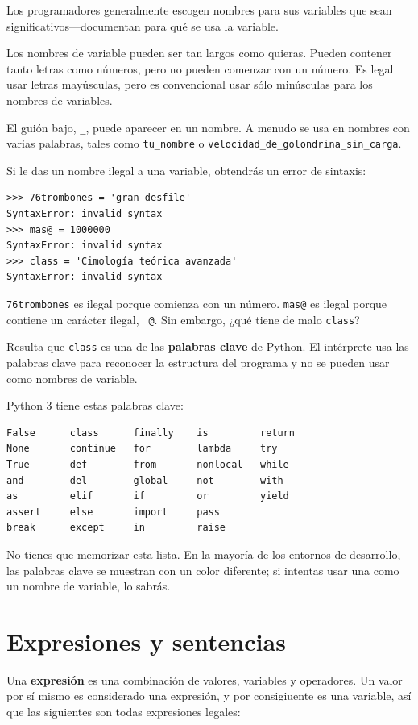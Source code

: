\documentclass[10pt]{book}
\begin{document}
Los programadores generalmente escogen nombres para sus variables que
sean significativos---documentan para qué se usa la variable.

Los nombres de variable pueden ser tan largos como quieras.  Pueden contener
tanto letras como números, pero no pueden comenzar con un número.
Es legal usar letras mayúsculas, pero es convencional
usar sólo minúsculas para los nombres de variables.

El guión bajo, \verb"_", puede aparecer en un nombre.
A menudo se usa en nombres con varias palabras, tales como
\verb"tu_nombre" o \verb"velocidad_de_golondrina_sin_carga".

Si le das un nombre ilegal a una variable, obtendrás un error de sintaxis:

\begin{verbatim}
>>> 76trombones = 'gran desfile'
SyntaxError: invalid syntax
>>> mas@ = 1000000
SyntaxError: invalid syntax
>>> class = 'Cimología teórica avanzada'
SyntaxError: invalid syntax
\end{verbatim}
%
{\tt 76trombones} es ilegal porque comienza con un número.
{\tt mas@} es ilegal porque contiene un carácter ilegal, {\tt
@}.  Sin embargo, ¿qué tiene de malo {\tt class}?

Resulta que {\tt class} es una de las {\bf palabras clave} de Python.  El
intérprete usa las palabras clave para reconocer la estructura del programa
y no se pueden usar como nombres de variable.

Python 3 tiene estas palabras clave:

\begin{verbatim}
False      class      finally    is         return
None       continue   for        lambda     try
True       def        from       nonlocal   while
and        del        global     not        with
as         elif       if         or         yield
assert     else       import     pass
break      except     in         raise
\end{verbatim}
%
No tienes que memorizar esta lista.  En la mayoría de los entornos de desarrollo,
las palabras clave se muestran con un color diferente; si intentas usar una
como un nombre de variable, lo sabrás.


\section{Expresiones y sentencias}

Una {\bf expresión} es una combinación de valores, variables y operadores.
Un valor por sí mismo es considerado una expresión, y por consigiuente es
una variable, así que las siguientes son todas expresiones legales:
\end{document}
